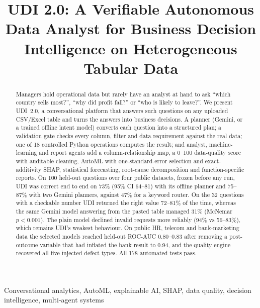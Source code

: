 \documentclass[conference]{IEEEtran}
\begin{document}
\title{UDI 2.0: A Verifiable Autonomous Data Analyst for Business Decision Intelligence on Heterogeneous Tabular Data}

\author{
}

\maketitle

\begin{abstract}
Managers hold operational data but rarely have an analyst at hand to ask ``which country sells most?'', ``why did profit fall?'' or ``who is likely to leave?''. We present UDI~2.0, a conversational platform that answers such questions on any uploaded CSV/Excel table and turns the answers into business decisions. A planner (Gemini, or a trained offline intent model) converts each question into a structured plan; a validation gate checks every column, filter and data requirement against the real data; one of 18 controlled Python operations computes the result; and analyst, machine-learning and report agents add a column-relationship map, a 0--100 data-quality score with auditable cleaning, AutoML with one-standard-error selection and exact-additivity SHAP, statistical forecasting, root-cause decomposition and function-specific reports. On 100 held-out questions over four public datasets, frozen before any run, UDI was correct end to end on 73\% (95\% CI 64--81) with its offline planner and 75--87\% with two Gemini planners, against 47\% for a keyword router. On the 32 questions with a checkable number UDI returned the right value 72--81\% of the time, whereas the same Gemini model answering from the pasted table managed 31\% (McNemar $p<0.001$). The plain model declined invalid requests more reliably (94\% vs 56--83\%), which remains UDI's weakest behaviour. On public HR, telecom and bank-marketing data the selected models reached held-out ROC-AUC 0.80--0.83 after removing a post-outcome variable that had inflated the bank result to 0.94, and the quality engine recovered all five injected defect types. All 178 automated tests pass.
\end{abstract}

\begin{IEEEkeywords}
Conversational analytics, AutoML, explainable AI, SHAP, data quality, decision intelligence, multi-agent systems
\end{IEEEkeywords}
\end{document}
